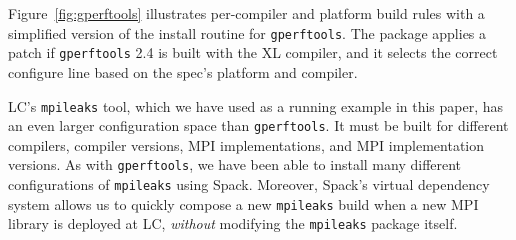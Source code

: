 Figure~\ref{fig:gperftools} illustrates per-compiler and platform build rules with
a simplified version of the install routine for {\tt gperftools}.
The package applies a patch if {\tt gperftools} 2.4 is built with the XL compiler,
and it selects the correct configure line based on the spec's platform and compiler.

LC's {\tt mpileaks} tool, which we have used as a running example in this paper,
has an even larger configuration space than {\tt gperftools}.  It must be built
for different compilers, compiler versions, MPI implementations, and MPI implementation
versions. As with {\tt gperftools}, we have been able to install many different
configurations of {\tt mpileaks} using Spack.  Moreover, Spack's virtual dependency system
allows us to
quickly compose a new {\tt mpileaks} build when a new MPI library is deployed at LC, {\it without}
modifying the {\tt mpileaks} package itself.
